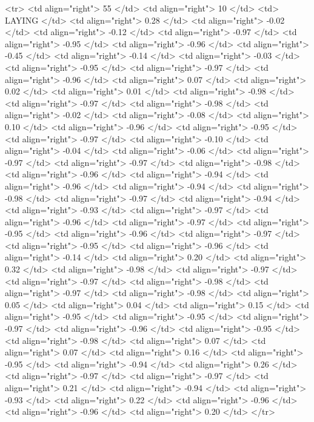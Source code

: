   <tr> <td align="right"> 55 </td> <td align="right">  10 </td> <td> LAYING </td> <td align="right"> 0.28 </td> <td align="right"> -0.02 </td> <td align="right"> -0.12 </td> <td align="right"> -0.97 </td> <td align="right"> -0.95 </td> <td align="right"> -0.96 </td> <td align="right"> -0.45 </td> <td align="right"> -0.14 </td> <td align="right"> -0.03 </td> <td align="right"> -0.95 </td> <td align="right"> -0.97 </td> <td align="right"> -0.96 </td> <td align="right"> 0.07 </td> <td align="right"> 0.02 </td> <td align="right"> 0.01 </td> <td align="right"> -0.98 </td> <td align="right"> -0.97 </td> <td align="right"> -0.98 </td> <td align="right"> -0.02 </td> <td align="right"> -0.08 </td> <td align="right"> 0.10 </td> <td align="right"> -0.96 </td> <td align="right"> -0.95 </td> <td align="right"> -0.97 </td> <td align="right"> -0.10 </td> <td align="right"> -0.04 </td> <td align="right"> -0.06 </td> <td align="right"> -0.97 </td> <td align="right"> -0.97 </td> <td align="right"> -0.98 </td> <td align="right"> -0.96 </td> <td align="right"> -0.94 </td> <td align="right"> -0.96 </td> <td align="right"> -0.94 </td> <td align="right"> -0.98 </td> <td align="right"> -0.97 </td> <td align="right"> -0.94 </td> <td align="right"> -0.93 </td> <td align="right"> -0.97 </td> <td align="right"> -0.96 </td> <td align="right"> -0.97 </td> <td align="right"> -0.95 </td> <td align="right"> -0.96 </td> <td align="right"> -0.97 </td> <td align="right"> -0.95 </td> <td align="right"> -0.96 </td> <td align="right"> -0.14 </td> <td align="right"> 0.20 </td> <td align="right"> 0.32 </td> <td align="right"> -0.98 </td> <td align="right"> -0.97 </td> <td align="right"> -0.97 </td> <td align="right"> -0.98 </td> <td align="right"> -0.97 </td> <td align="right"> -0.98 </td> <td align="right"> 0.05 </td> <td align="right"> 0.04 </td> <td align="right"> 0.15 </td> <td align="right"> -0.95 </td> <td align="right"> -0.95 </td> <td align="right"> -0.97 </td> <td align="right"> -0.96 </td> <td align="right"> -0.95 </td> <td align="right"> -0.98 </td> <td align="right"> 0.07 </td> <td align="right"> 0.07 </td> <td align="right"> 0.16 </td> <td align="right"> -0.95 </td> <td align="right"> -0.94 </td> <td align="right"> 0.26 </td> <td align="right"> -0.97 </td> <td align="right"> -0.97 </td> <td align="right"> 0.21 </td> <td align="right"> -0.94 </td> <td align="right"> -0.93 </td> <td align="right"> 0.22 </td> <td align="right"> -0.96 </td> <td align="right"> -0.96 </td> <td align="right"> 0.20 </td> </tr>
